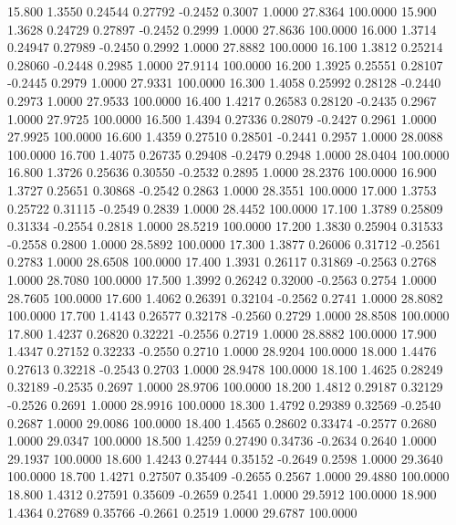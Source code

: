   15.800   1.3550   0.24544   0.27792  -0.2452   0.3007   1.0000  27.8364 100.0000
  15.900   1.3628   0.24729   0.27897  -0.2452   0.2999   1.0000  27.8636 100.0000
  16.000   1.3714   0.24947   0.27989  -0.2450   0.2992   1.0000  27.8882 100.0000
  16.100   1.3812   0.25214   0.28060  -0.2448   0.2985   1.0000  27.9114 100.0000
  16.200   1.3925   0.25551   0.28107  -0.2445   0.2979   1.0000  27.9331 100.0000
  16.300   1.4058   0.25992   0.28128  -0.2440   0.2973   1.0000  27.9533 100.0000
  16.400   1.4217   0.26583   0.28120  -0.2435   0.2967   1.0000  27.9725 100.0000
  16.500   1.4394   0.27336   0.28079  -0.2427   0.2961   1.0000  27.9925 100.0000
  16.600   1.4359   0.27510   0.28501  -0.2441   0.2957   1.0000  28.0088 100.0000
  16.700   1.4075   0.26735   0.29408  -0.2479   0.2948   1.0000  28.0404 100.0000
  16.800   1.3726   0.25636   0.30550  -0.2532   0.2895   1.0000  28.2376 100.0000
  16.900   1.3727   0.25651   0.30868  -0.2542   0.2863   1.0000  28.3551 100.0000
  17.000   1.3753   0.25722   0.31115  -0.2549   0.2839   1.0000  28.4452 100.0000
  17.100   1.3789   0.25809   0.31334  -0.2554   0.2818   1.0000  28.5219 100.0000
  17.200   1.3830   0.25904   0.31533  -0.2558   0.2800   1.0000  28.5892 100.0000
  17.300   1.3877   0.26006   0.31712  -0.2561   0.2783   1.0000  28.6508 100.0000
  17.400   1.3931   0.26117   0.31869  -0.2563   0.2768   1.0000  28.7080 100.0000
  17.500   1.3992   0.26242   0.32000  -0.2563   0.2754   1.0000  28.7605 100.0000
  17.600   1.4062   0.26391   0.32104  -0.2562   0.2741   1.0000  28.8082 100.0000
  17.700   1.4143   0.26577   0.32178  -0.2560   0.2729   1.0000  28.8508 100.0000
  17.800   1.4237   0.26820   0.32221  -0.2556   0.2719   1.0000  28.8882 100.0000
  17.900   1.4347   0.27152   0.32233  -0.2550   0.2710   1.0000  28.9204 100.0000
  18.000   1.4476   0.27613   0.32218  -0.2543   0.2703   1.0000  28.9478 100.0000
  18.100   1.4625   0.28249   0.32189  -0.2535   0.2697   1.0000  28.9706 100.0000
  18.200   1.4812   0.29187   0.32129  -0.2526   0.2691   1.0000  28.9916 100.0000
  18.300   1.4792   0.29389   0.32569  -0.2540   0.2687   1.0000  29.0086 100.0000
  18.400   1.4565   0.28602   0.33474  -0.2577   0.2680   1.0000  29.0347 100.0000
  18.500   1.4259   0.27490   0.34736  -0.2634   0.2640   1.0000  29.1937 100.0000
  18.600   1.4243   0.27444   0.35152  -0.2649   0.2598   1.0000  29.3640 100.0000
  18.700   1.4271   0.27507   0.35409  -0.2655   0.2567   1.0000  29.4880 100.0000
  18.800   1.4312   0.27591   0.35609  -0.2659   0.2541   1.0000  29.5912 100.0000
  18.900   1.4364   0.27689   0.35766  -0.2661   0.2519   1.0000  29.6787 100.0000
